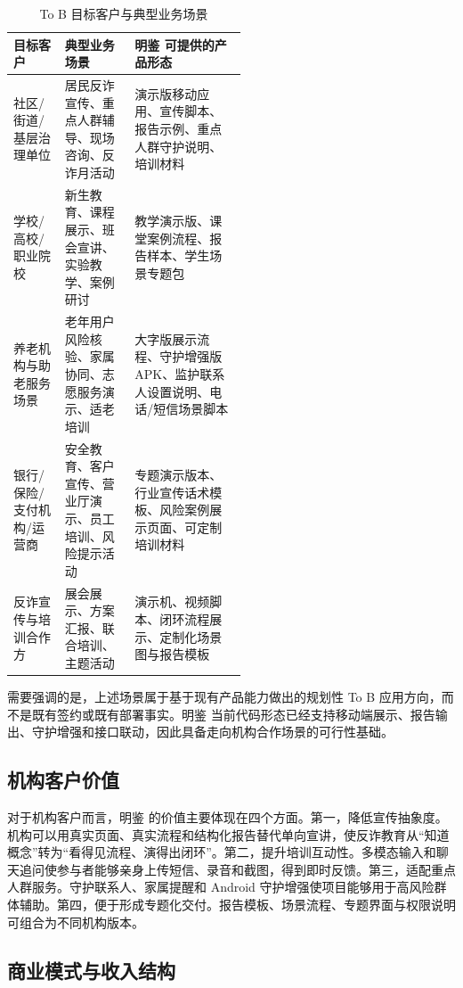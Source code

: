 \documentclass[UTF8,a4paper,12pt]{ctexart}
\begin{document}
\begin{table}[!htbp]
    \centering
    \caption{To B 目标客户与典型业务场景}
    \label{tab:tob-target-customers}
    \renewcommand{\arraystretch}{1.45}
    \begin{tabularx}{\linewidth}{p{0.22\linewidth}p{0.30\linewidth}Y}
        \toprule
        目标客户 & 典型业务场景 & 明鉴 可提供的产品形态 \\
        \midrule
        社区/街道/基层治理单位 & 居民反诈宣传、重点人群辅导、现场咨询、反诈月活动 & 演示版移动应用、宣传脚本、报告示例、重点人群守护说明、培训材料 \\
        学校/高校/职业院校 & 新生教育、课程展示、班会宣讲、实验教学、案例研讨 & 教学演示版、课堂案例流程、报告样本、学生场景专题包 \\
        养老机构与助老服务场景 & 老年用户风险核验、家属协同、志愿服务演示、适老培训 & 大字版展示流程、守护增强版 APK、监护联系人设置说明、电话/短信场景脚本 \\
        银行/保险/支付机构/运营商 & 安全教育、客户宣传、营业厅演示、员工培训、风险提示活动 & 专题演示版本、行业宣传话术模板、风险案例展示页面、可定制培训材料 \\
        反诈宣传与培训合作方 & 展会展示、方案汇报、联合培训、主题活动 & 演示机、视频脚本、闭环流程展示、定制化场景图与报告模板 \\
        \bottomrule
    \end{tabularx}
\end{table}

需要强调的是，上述场景属于基于现有产品能力做出的规划性 To B 应用方向，而不是既有签约或既有部署事实。明鉴 当前代码形态已经支持移动端展示、报告输出、守护增强和接口联动，因此具备走向机构合作场景的可行性基础。

\subsection{机构客户价值}

对于机构客户而言，明鉴 的价值主要体现在四个方面。第一，降低宣传抽象度。机构可以用真实页面、真实流程和结构化报告替代单向宣讲，使反诈教育从“知道概念”转为“看得见流程、演得出闭环”。第二，提升培训互动性。多模态输入和聊天追问使参与者能够亲身上传短信、录音和截图，得到即时反馈。第三，适配重点人群服务。守护联系人、家属提醒和 Android 守护增强使项目能够用于高风险群体辅助。第四，便于形成专题化交付。报告模板、场景流程、专题界面与权限说明可组合为不同机构版本。

\subsection{商业模式与收入结构}
\end{document}

